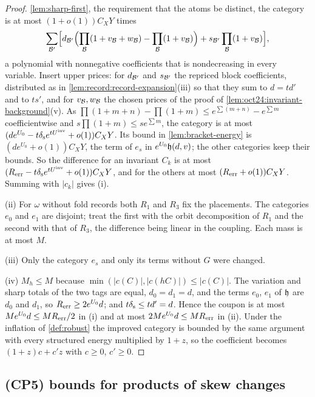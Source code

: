 \begin{proof}
\cref{lem:sharp-first}, the requirement that the atoms be distinct, the category is
at most $(1+o(1))C_XY$ times
\[
 \sum_{\mathcal B'}\Bigl[d_{\mathcal B'}\Bigl(\prod_\mathcal B(1+v_\mathcal B+w_\mathcal B)-\prod_\mathcal B(1+v_\mathcal B)\Bigr)
 +s_{\mathcal B'}\prod_\mathcal B(1+v_\mathcal B)\Bigr],
\]
a polynomial with nonnegative coefficients that is nondecreasing in every variable.
Insert upper prices: for $d_{\mathcal B'}$ and $s_{\mathcal B'}$ the repriced block coefficients,
distributed as in \cref{lem:record:record-expansion}(iii) so that they sum to $d=td'$
and to $ts'$, and for $v_\mathcal B,w_\mathcal B$ the chosen prices of the proof of
\cref{lem:oct24:invariant-background}(v). As
$\prod(1+m+n)-\prod(1+m)\le e^{\sum(m+n)}-e^{\sum m}$ coefficientwise and $s\prod(1+m)\le
se^{\sum m}$, the category is at most $(de^{U_0}-t\delta_{\rm s}e^{tU^{\mathrm{inv}}}+o(1))C_XY$. Its
bound in \cref{lem:bracket-energy} is $(de^{U_0}+o(1))C_XY$, the term of $e_s$ in
$e^{U_0}\mathfrak h(d,v)$; the other categories keep their bounds. So the difference for an
invariant $C_k$ is at most $(R_{\rm err}-t\delta_{\rm s}e^{tU^{\mathrm{inv}}}+o(1))C_XY$, and for the
others at most $(R_{\rm err}+o(1))C_XY$. Summing with $|c_k|$ gives (i).

(ii) For $\omega$ without fold records both $R_1$ and $R_3$ fix the placements. The
categories $e_0$ and $e_1$ are disjoint; treat the first with the orbit
decomposition of $R_1$ and the second with that of $R_3$, the difference being linear
in the coupling. Each mass is at most $M$.

(iii) Only the category $e_s$ and only its terms without $G$ were changed.

(iv) $M_h\le M$ because $\min(|c(C)|,|c(hC)|)\le|c(C)|$. The variation and sharp totals
of the two tags are equal, $d_0=d_1=d$, and the terms $e_0$, $e_1$ of $\mathfrak h$ are
$d_0$ and $d_1$, so $R_{\rm err}\ge2e^{U_0}d$; and $t\delta_{\rm s}\le td'=d$. Hence the
coupon is at most $Me^{U_0}d\le MR_{\rm err}/2$ in (i) and at most $2Me^{U_0}d\le MR_{\rm err}$
in (ii). Under the inflation of \cref{def:robust} the improved category is bounded by
the same argument with every structured energy multiplied by $1+z$, so the
coefficient becomes $(1+z)c+c'z$ with $c\ge0$, $c'\ge0$.
\end{proof}

\subsection{(CP5) bounds for products of skew changes}\label{subsec:envelope-theorem}

